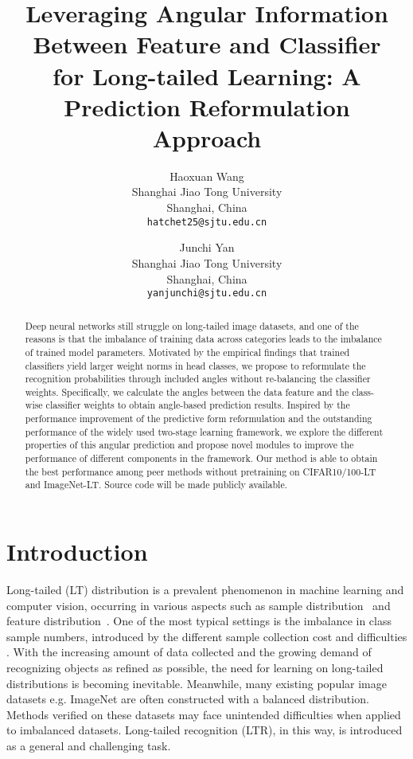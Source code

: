 \documentclass[10pt,twocolumn,letterpaper]{article}
\begin{document}
\title{Leveraging Angular Information Between Feature and Classifier\\ for Long-tailed Learning: A Prediction Reformulation Approach}

\author{Haoxuan Wang\\
Shanghai Jiao Tong University\\
Shanghai, China\\
{\tt\small hatchet25@sjtu.edu.cn}
\and
Junchi Yan\\
Shanghai Jiao Tong University\\
Shanghai, China\\
{\tt\small yanjunchi@sjtu.edu.cn}
}
\maketitle

\begin{abstract}
   Deep neural networks still struggle on long-tailed image datasets, and one of the reasons is that the imbalance of training data across categories leads to the imbalance of trained model parameters. Motivated by the empirical findings that trained classifiers yield larger weight norms in head classes, we propose to reformulate the recognition probabilities through included angles without re-balancing the classifier weights. Specifically, we calculate the angles between the data feature and the class-wise classifier weights to obtain angle-based prediction results. Inspired by the performance improvement of the predictive form reformulation and the outstanding performance of the widely used two-stage learning framework, we explore the different properties of this angular prediction and propose novel modules to improve the performance of different components in the framework. Our method is able to obtain the best performance among peer methods without pretraining on CIFAR10/100-LT and ImageNet-LT. Source code will be made publicly available.
\end{abstract}










\section{Introduction}
\label{sec:intro}
Long-tailed (LT) distribution is a prevalent phenomenon in machine learning and computer vision, occurring in various aspects such as sample distribution~\cite{border_smote} and feature distribution~\cite{glt}. One of the most typical settings is the imbalance in class sample numbers, introduced by the different sample collection cost and difficulties \cite{ina2018}. With the increasing amount of data collected and the growing demand of recognizing objects as refined as possible, the need for learning on long-tailed distributions is becoming inevitable. Meanwhile, many existing popular image datasets e.g. ImageNet \cite{imagenet} are often constructed with a balanced distribution. Methods verified on these datasets may face unintended difficulties when applied to imbalanced datasets. Long-tailed recognition (LTR), in this way, is introduced as a general and challenging task.
\end{document}
